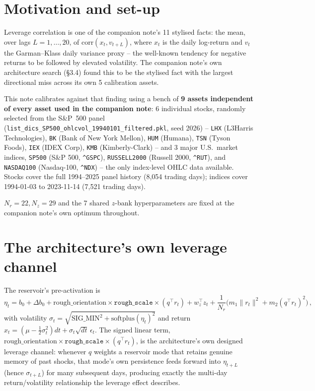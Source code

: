 \documentclass[11pt]{article}
\begin{document}
\tableofcontents

\section{Motivation and set-up}
Leverage correlation is one of the companion note's 11 stylised facts: the
mean, over lags $L=1,\dots,20$, of $\text{corr}(x_t,v_{t+L})$, where $x_t$ is
the daily log-return and $v_t$ the Garman--Klass daily variance proxy -- the
well-known tendency for negative returns to be followed by elevated
volatility. The companion note's own architecture search (\S3.4) found this to
be the stylised fact with the largest directional miss across its own 5
calibration assets.

This note calibrates against that finding using a bench of \textbf{9 assets
independent of every asset used in the companion note}: 6 individual stocks,
randomly selected from the S\&P~500 panel
(\texttt{list\_dics\_SP500\_ohlcvol\_19940101\_filtered.pkl}, seed 2026) --
\texttt{LHX} (L3Harris Technologies), \texttt{BK} (Bank of New York Mellon),
\texttt{HUM} (Humana), \texttt{TSN} (Tyson Foods), \texttt{IEX} (IDEX Corp),
\texttt{KMB} (Kimberly-Clark) -- and 3 major U.S.\ market indices,
\texttt{SP500} (S\&P 500, \texttt{\^{}GSPC}), \texttt{RUSSELL2000} (Russell
2000, \texttt{\^{}RUT}), and \texttt{NASDAQ100} (Nasdaq-100, \texttt{\^{}NDX})
-- the only index-level OHLC data available. Stocks cover the full 1994--2025
panel history (8,054 trading days); indices cover 1994-01-03 to 2023-11-14
(7,521 trading days).

$N_r=22,N_z=29$ and the 7 shared $z$-bank hyperparameters are fixed at the
companion note's own optimum throughout.

\section{The architecture's own leverage channel}
\label{sec:mechanism}
The reservoir's pre-activation is
\begin{equation}
\eta_t = b_0 + \Delta b_0 + \text{rough\_orientation}\times
\texttt{rough\_scale}\times(q^\top r_t) + w_z^\top z_t +
\frac{1}{N_r}\Big(m_1\lVert r_t\rVert^2 + m_2 (q^\top r_t)^2\Big)\, ,
\label{eq:eta}
\end{equation}
with volatility $\sigma_t=\sqrt{\text{SIG\_MIN}^2+\text{softplus}(\eta_t)^2}$
and return $x_t=(\mu-\tfrac12\sigma_t^2)dt+\sigma_t\sqrt{dt}\,\epsilon_t$. The
signed linear term, $\text{rough\_orientation}\times\texttt{rough\_scale}
\times(q^\top r_t)$, is the architecture's own designed leverage channel:
whenever $q$ weights a reservoir mode that retains genuine memory of past
shocks, that mode's own persistence feeds forward into $\eta_{t+L}$ (hence
$\sigma_{t+L}$) for many subsequent days, producing exactly the
multi-day return/volatility relationship the leverage effect describes.
\end{document}
